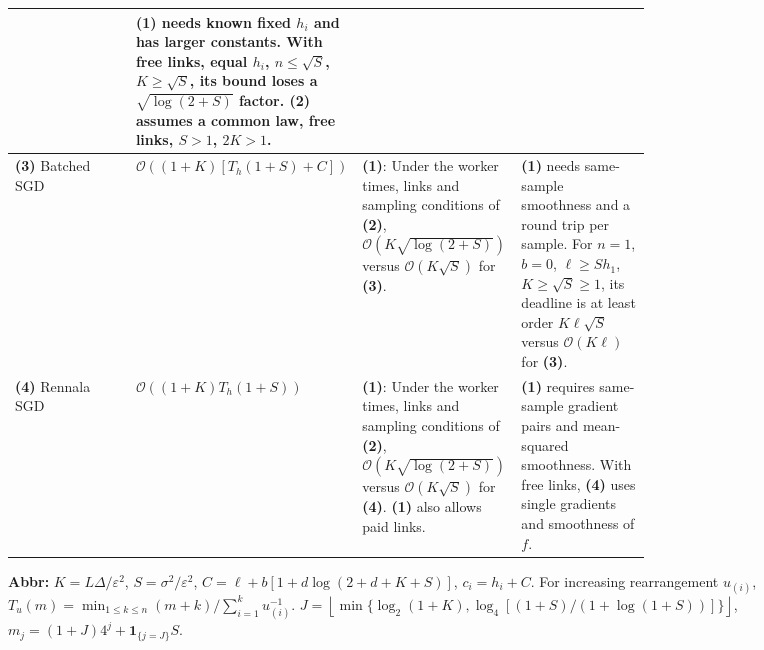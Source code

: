 \begin{table}[tp]
\begin{threeparttable}
\begin{tabularx}{\linewidth}{@{}>{\raggedright\arraybackslash}p{0.19\linewidth}>{\raggedright\arraybackslash}p{0.30\linewidth}>{\raggedright\arraybackslash}p{0.25\linewidth}>{\raggedright\arraybackslash}X@{}}
& \textbf{(1)} needs known fixed $h_i$ and has larger constants. With free links, equal $h_i$, $n\le\sqrt S$, $K\ge\sqrt S$, its bound loses a $\sqrt{\log(2+S)}$ factor. \textbf{(2)} assumes a common law, free links, $S>1$, $2K>1$. \\
\midrule
\textbf{(3)} Batched SGD \citep{dhlnBatchedRepository}
& $\mathcal{O}\!\left((1+K)[T_h(1+S)+C]\right)$
& \textbf{(1)}: Under the worker times, links and sampling conditions of \textbf{(2)}, $\mathcal{O}(K\sqrt{\log(2+S)})$ versus $\mathcal{O}(K\sqrt S)$ for \textbf{(3)}.
& \textbf{(1)} needs same-sample smoothness and a round trip per sample. For $n=1$, $b=0$, $\ell\ge Sh_1$, $K\ge\sqrt S\ge1$, its deadline is at least order $K\ell\sqrt S$ versus $\mathcal{O}(K\ell)$ for \textbf{(3)}. \\
\midrule
\textbf{(4)} Rennala SGD \citep[Thm.~7.5]{dmssRennalaSGD2023}
& $\mathcal{O}\!\left((1+K)T_h(1+S)\right)$
& \textbf{(1)}: Under the worker times, links and sampling conditions of \textbf{(2)}, $\mathcal{O}(K\sqrt{\log(2+S)})$ versus $\mathcal{O}(K\sqrt S)$ for \textbf{(4)}. \textbf{(1)} also allows paid links.
& \textbf{(1)} requires same-sample gradient pairs and mean-squared smoothness. With free links, \textbf{(4)} uses single gradients and smoothness of $f$. \\
\bottomrule
\end{tabularx}
\begin{tablenotes}[flushleft]\footnotesize
\item[] \textbf{Abbr:} $K=L\Delta/\varepsilon^2$, $S=\sigma^2/\varepsilon^2$, $C=\ell+b[1+d\log(2+d+K+S)]$, $c_i=h_i+C$.
For increasing rearrangement $u_{(i)}$, $T_u(m)=\min_{1\le k\le n}(m+k)/\sum_{i=1}^k u_{(i)}^{-1}$.
$J=\left\lfloor\min\{\log_2(1+K),\log_4[(1+S)/(1+\log(1+S))]\}\right\rfloor$,
$m_j=(1+J)4^j+\mathbf 1_{\{j=J\}}S$.
\end{tablenotes}
\end{threeparttable}
\end{table}
